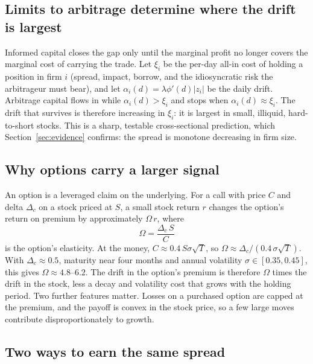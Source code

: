 \documentclass[11pt]{article}
\theoremstyle{definition}
\newcommand{\1}{\mathbf{1}}
\begin{document}
\subsection{Limits to arbitrage determine where the drift is largest}

Informed capital closes the gap only until the marginal profit no longer covers the
marginal cost of carrying the trade. Let $\xi_i$ be the per-day all-in cost of holding a
position in firm $i$ (spread, impact, borrow, and the idiosyncratic risk the arbitrageur must
bear), and let $\alpha_i(d)=\lambda\phi'(d)|z_i|$ be the daily drift. Arbitrage capital
flows in while $\alpha_i(d)>\xi_i$ and stops when $\alpha_i(d)\approx\xi_i$. The drift that
survives is therefore increasing in $\xi_i$: it is largest in small, illiquid, hard-to-short
stocks. This is a sharp, testable cross-sectional prediction, which
Section~\ref{sec:evidence} confirms: the spread is monotone decreasing in firm size.

\subsection{Why options carry a larger signal}

An option is a leveraged claim on the underlying. For a call with price $C$ and delta $\Delta_c$
on a stock priced at $S$, a small stock return $r$ changes the option's return on premium by
approximately $\Omega\, r$, where
\begin{equation}
  \Omega=\frac{\Delta_c\,S}{C}
  \label{eq:omega}
\end{equation}
is the option's elasticity. At the money, $C\approx0.4\,S\sigma\sqrt{T}$, so
$\Omega\approx\Delta_c/(0.4\,\sigma\sqrt T)$. With $\Delta_c\approx0.5$, maturity near four
months and annual volatility $\sigma\in[0.35,0.45]$, this gives $\Omega\approx 4.8$--$6.2$.
The drift in the option's premium is therefore $\Omega$ times the drift in the stock, less a
decay and volatility cost that grows with the holding period. Two further features matter.
Losses on a purchased option are capped at the premium, and the payoff is convex in the
stock price, so a few large moves contribute disproportionately to growth.

\subsection{Two ways to earn the same spread}
\end{document}
